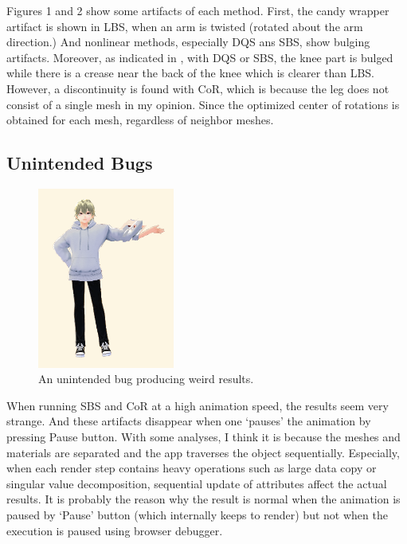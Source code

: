 \documentclass{homework}
\begin{document}
Figures 1 and 2 show some artifacts of each method. First, the candy wrapper artifact is shown in LBS, when an arm is twisted (rotated about the arm direction.) And nonlinear methods, especially DQS ans SBS, show bulging artifacts. Moreover, as indicated in \cite[Figure 4]{Le2016}, with DQS or SBS, the knee part is bulged while there is a crease near the back of the knee which is clearer than LBS. However, a discontinuity is found with CoR, which is because the leg does not consist of a single mesh in my opinion. Since the optimized center of rotations is obtained for each mesh, regardless of neighbor meshes.

\subsection{Unintended Bugs}
\begin{figure}[H]
    \centering
    \includegraphics[width=0.4\textwidth]{images/artifact1.png}
    \caption{An unintended bug producing weird results.}
\end{figure}
When running SBS and CoR at a high animation speed, the results seem very strange. And these artifacts disappear when one `pauses' the animation by pressing Pause button. With some analyses, I think it is because the meshes and materials are separated and the app traverses the object sequentially. Especially, when each render step contains heavy operations such as large data copy or singular value decomposition, sequential update of attributes affect the actual results. It is probably the reason why the result is normal when the animation is paused by `Pause' button (which internally keeps to render) but not when the execution is paused using browser debugger.








\end{document}
